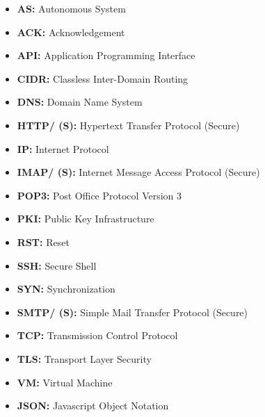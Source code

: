 \begin{itemize}
    \item \textbf{AS:} Autonomous System
    \item \textbf{ACK:} Acknowledgement
    \item \textbf{API:} Application Programming Interface
    \item \textbf{CIDR:} Classless Inter-Domain Routing
    \item \textbf{DNS:} Domain Name System
    \item \textbf{HTTP/ (S):} Hypertext Transfer Protocol (Secure)
    \item \textbf{IP:} Internet Protocol
    \item \textbf{IMAP/ (S):} Internet Message Access Protocol (Secure)
    \item \textbf{POP3:} Post Office Protocol Version 3
    \item \textbf{PKI:} Public Key Infrastructure
    \item \textbf{RST:} Reset
    \item \textbf{SSH:} Secure Shell 
    \item \textbf{SYN:} Synchronization
    \item \textbf{SMTP/ (S):} Simple Mail Transfer Protocol (Secure)
    \item \textbf{TCP:} Transmission Control Protocol
    \item \textbf{TLS:} Transport Layer Security
    \item \textbf{VM:} Virtual Machine
    \item \textbf{JSON:} Javascript Object Notation 
\end{itemize}